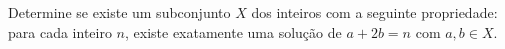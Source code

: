 Determine se existe um subconjunto \(X\) dos inteiros com a seguinte propriedade:
para cada inteiro \(n\), existe exatamente uma solução de \(a + 2b = n\) com \(a, b \in X\).
